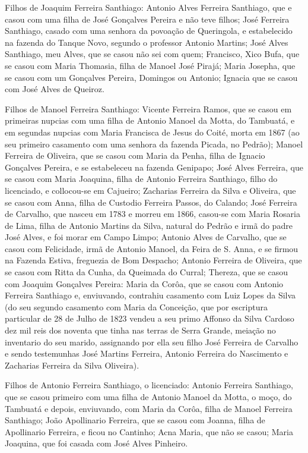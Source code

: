 Filhos de Joaquim Ferreira Santhiago: Antonio Alves Ferreira Santhiago, que e casou com uma filha de José Gonçalves Pereira e não teve filhos; José Ferreira Santhiago, casado com uma senhora da povoação de Queringola, e estabelecido na fazenda do Tanque Novo, segundo o professor Antonio Martins; José Alves Santhiago, meu Alves, que se casou não sei com quem; Francisco, Xico Bufa, que se casou com Maria Thomasia, filha de Manoel José Pirajá; Maria Josepha, que se casou com um Gonçalves Pereira, Domingos ou Antonio; Ignacia que se casou com José Alves de Queiroz.

Filhos de Manoel Ferreira Santhiago: Vicente Ferreira Ramos, que se casou em primeiras nupcias com uma filha de Antonio Manoel da Motta, do Tambuatá, e em segundas nupcias com Maria Francisca de Jesus do Coité, morta em 1867 (ao seu primeiro casamento com uma senhora da fazenda Picada, no Pedrão); Manoel Ferreira de Oliveira, que se casou com Maria da Penha, filha de Ignacio Gonçalves Pereira, e se estabeleceu na fazenda Genipapo; José Alves Ferreira, que se casou com Maria Joaquina, filha de Antonio Ferreira Santhiago, filho do licenciado, e collocou-se em Cajueiro; Zacharias Ferreira da Silva e Oliveira, que se casou com Anna, filha de Custodio Ferreira Passos, do Calando; José Ferreira de Carvalho, que nasceu em 1783 e morreu em 1866, casou-se com Maria Rosaria de Lima, filha de Antonio Martins da Silva, natural do Pedrão e irmã do padre José Alves, e foi morar em Campo Limpo; Antonio Alves de Carvalho, que se casou com Felicidade, irmã de Antonio Manoel, da Feira de S. Anna, e se firmou na Fazenda Estiva, freguezia de Bom Despacho; Antonio Ferreira de Oliveira, que se casou com Ritta da Cunha, da Queimada do Curral; Thereza, que se casou com Joaquim Gonçalves Pereira: Maria da Corôa, que se casou com Antonio Ferreira Santhiago e, enviuvando, contrahiu casamento com Luiz Lopes da Silva (do seu segundo casamento com Maria da Conceição, que por escriptura particular de 28 de Julho de 1823 vendeu a seu primo Affonso da Silva Cardoso dez mil reis dos noventa que tinha nas terras de Serra Grande, meiação no inventario do seu marido, assignando por ella seu filho José Ferreira de Carvalho e sendo testemunhas José Martins Ferreira, Antonio Ferreira do Nascimento e Zacharias Ferreira da Silva Oliveira).

Filhos de Antonio Ferreira Santhiago, o licenciado: Antonio Ferreira Santhiago, que se casou primeiro com uma filha de Antonio Manoel da Motta, o moço, do Tambuatá e depois, enviuvando, com Maria da Corôa, filha de Manoel Ferreira Santhiago; João Apollinario Ferreira, que se casou com Joanna, filha de Apollinario Ferreira, e ficou no Cantinho;
Acna Maria, que não se casou; Maria Joaquina, que foi casada com José Alves Pinheiro.

